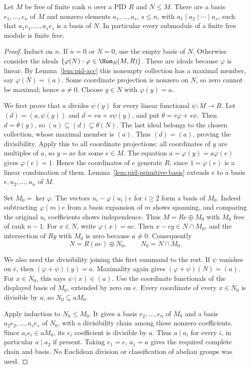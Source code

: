 \begin{theorem}\label{thm:pid-smith-diagonalization}\label{thm:pid-submodule-free}
Let $M$ be free of finite rank $n$ over a PID $R$ and $N\le M$.
There are a basis $e_1,\ldots,e_n$ of $M$ and nonzero elements
$a_1,\ldots,a_s$, $s\le n$, with
$a_1\mid a_2\mid\cdots\mid a_s$, such that
$a_1e_1,\ldots,a_se_s$ is a basis of $N$.
In particular every submodule of a finite free module is finite free.
\end{theorem}
\begin{proof}
Induct on $n$. If $n=0$ or $N=0$, use the empty basis of $N$.
Otherwise consider the ideals
$\{\varphi(N):\varphi\in\Hom_R(M,R)\}$.
These are ideals because $\varphi$ is linear. By
Lemma~\ref{lem:pid-acc} this nonempty collection has a maximal member,
say $\varphi(N)=(a)$. Some coordinate projection is nonzero on $N$,
so zero cannot be maximal; hence $a\ne0$.
Choose $y\in N$ with $\varphi(y)=a$.

We first prove that $a$ divides $\psi(y)$ for every linear functional
$\psi:M\to R$. Let $(d)=(a,\psi(y))$ and
$d=ra+s\psi(y)$, and put $\theta=r\varphi+s\psi$.
Then $d=\theta(y)$, so
$(a)\subseteq(d)\subseteq\theta(N)$.
The last ideal belongs to the chosen collection, whose maximal member
is $(a)$. Thus $(d)=(a)$, proving the divisibility.
Apply this to all coordinate projections: all coordinates of $y$ are
multiples of $a$, so $y=ae$ for some $e\in M$.
The equation $a=\varphi(y)=a\varphi(e)$ gives $\varphi(e)=1$.
Hence the coordinates of $e$ generate $R$, since $1=\varphi(e)$
is a linear combination of them. Lemma~\ref{lem:pid-primitive-basis}
extends $e$ to a basis $e,u_2,\ldots,u_n$ of $M$.

Set $M_0=\ker\varphi$. The vectors
$u_i-\varphi(u_i)e$ for $i\ge2$ form a basis of $M_0$.
Indeed subtracting $\varphi(m)e$ from a basis expansion of $m$
shows spanning, and comparing the original $u_i$ coefficients shows
independence. Thus $M=Re\oplus M_0$ with $M_0$ free of rank $n-1$.
For $x\in N$, write $\varphi(x)=ac$. Then $x-cy\in N\cap M_0$,
and the intersection of $Ry$ with $M_0$ is zero because $a\ne0$.
Consequently
\[
 N=R(ae)\oplus N_0,\qquad N_0=N\cap M_0.
\]

We also need the divisibility joining this first summand to the rest.
If $\psi$ vanishes on $e$, then
$(\varphi+\psi)(y)=a$. Maximality again gives
$(\varphi+\psi)(N)=(a)$. For $x\in N_0$, this says $\psi(x)\in(a)$.
Use the coordinate functionals of the displayed basis of $M_0$, extended
by zero on $e$. Every coordinate of every $x\in N_0$ is divisible by
$a$, so $N_0\subseteq aM_0$.

Apply induction to $N_0\le M_0$. It gives a basis $e_2,\ldots,e_n$
of $M_0$ and a basis $a_2e_2,\ldots,a_se_s$ of $N_0$, with a
divisibility chain among these nonzero coefficients.
Since $a_i e_i\in aM_0$, its $e_i$ coefficient is divisible by $a$.
Thus $a\mid a_i$ for every $i$, in particular $a\mid a_2$ if present.
Taking $e_1=e$, $a_1=a$ gives the required complete chain and basis.
No Euclidean division or classification of abelian groups was used.
\end{proof}

